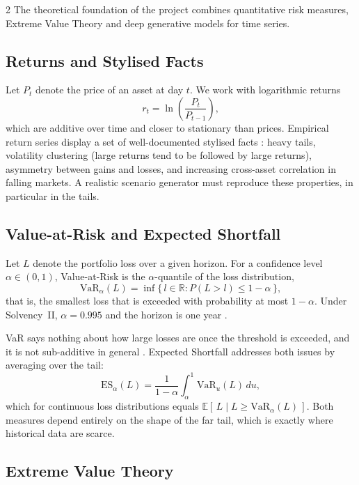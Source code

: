 \documentclass[12pt]{spieman}  %
\begin{document}
\begin{spacing}{2}
The theoretical foundation of the project combines quantitative risk measures, Extreme Value Theory and deep generative models for time series.

\subsection{Returns and Stylised Facts}

Let $P_t$ denote the price of an asset at day $t$. We work with logarithmic returns
\begin{equation}
r_t = \ln\left(\frac{P_t}{P_{t-1}}\right),
\end{equation}
which are additive over time and closer to stationary than prices. Empirical return series display a set of well-documented stylised facts \cite{Cont01}: heavy tails, volatility clustering (large returns tend to be followed by large returns), asymmetry between gains and losses, and increasing cross-asset correlation in falling markets. A realistic scenario generator must reproduce these properties, in particular in the tails.

\subsection{Value-at-Risk and Expected Shortfall}

Let $L$ denote the portfolio loss over a given horizon. For a confidence level $\alpha \in (0,1)$, Value-at-Risk is the $\alpha$-quantile of the loss distribution,
\begin{equation}
\mathrm{VaR}_\alpha(L) = \inf\{\, l \in \mathbb{R} : P(L > l) \le 1-\alpha \,\},
\end{equation}
that is, the smallest loss that is exceeded with probability at most $1-\alpha$. Under Solvency~II, $\alpha = 0.995$ and the horizon is one year \cite{SolvencyII}.

VaR says nothing about how large losses are once the threshold is exceeded, and it is not sub-additive in general \cite{Artzner99}. Expected Shortfall addresses both issues by averaging over the tail:
\begin{equation}
\mathrm{ES}_\alpha(L) = \frac{1}{1-\alpha}\int_\alpha^1 \mathrm{VaR}_u(L)\,du,
\end{equation}
which for continuous loss distributions equals $\mathbb{E}[\,L \mid L \ge \mathrm{VaR}_\alpha(L)\,]$. Both measures depend entirely on the shape of the far tail, which is exactly where historical data are scarce.

\subsection{Extreme Value Theory}


\end{spacing}
\end{document}
